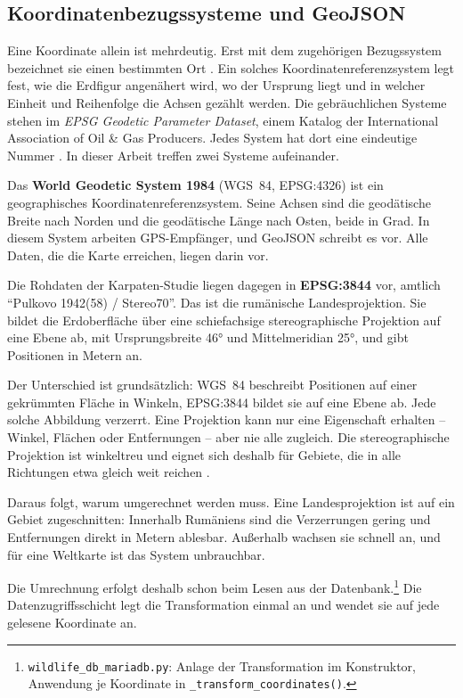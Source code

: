 \documentclass[12pt,a4paper]{report}
\begin{document}
\subsection{Koordinatenbezugssysteme und GeoJSON}
\label{subsec:crs}

Eine Koordinate allein ist mehrdeutig. Erst mit dem zugehörigen Bezugssystem bezeichnet
sie einen bestimmten Ort \cite{GISGrundlagen}. Ein solches Koordinatenreferenzsystem legt
fest, wie die Erdfigur angenähert wird, wo der Ursprung liegt und in welcher Einheit und
Reihenfolge die Achsen gezählt werden. Die gebräuchlichen Systeme stehen im \emph{EPSG
Geodetic Parameter Dataset}, einem Katalog der International Association of Oil \& Gas
Producers. Jedes System hat dort eine eindeutige Nummer \cite{EPSG}. In dieser Arbeit
treffen zwei Systeme aufeinander.

Das \textbf{World Geodetic System 1984} (WGS~84, EPSG:4326) ist ein geographisches
Koordinatenreferenzsystem. Seine Achsen sind die geodätische Breite nach Norden und die
geodätische Länge nach Osten, beide in Grad. In diesem System arbeiten GPS-Empfänger, und
GeoJSON schreibt es vor. Alle Daten, die die Karte erreichen, liegen darin vor.

Die Rohdaten der Karpaten-Studie liegen dagegen in \textbf{EPSG:3844} vor, amtlich
\enquote{Pulkovo 1942(58) / Stereo70}. Das ist die rumänische Landesprojektion. Sie bildet
die Erdoberfläche über eine schiefachsige stereographische Projektion auf eine Ebene ab,
mit Ursprungsbreite 46° und Mittelmeridian 25°, und gibt Positionen in Metern an.

Der Unterschied ist grundsätzlich: WGS~84 beschreibt Positionen auf einer gekrümmten
Fläche in Winkeln, EPSG:3844 bildet sie auf eine Ebene ab. Jede solche Abbildung verzerrt.
Eine Projektion kann nur eine Eigenschaft erhalten -- Winkel, Flächen oder Entfernungen --
aber nie alle zugleich. Die stereographische Projektion ist winkeltreu und eignet sich
deshalb für Gebiete, die in alle Richtungen etwa gleich weit reichen \cite{Snyder1987}.

Daraus folgt, warum umgerechnet werden muss. Eine Landesprojektion ist auf ein Gebiet
zugeschnitten: Innerhalb Rumäniens sind die Verzerrungen gering und Entfernungen direkt in
Metern ablesbar. Außerhalb wachsen sie schnell an, und für eine Weltkarte ist das System
unbrauchbar.

Die Umrechnung erfolgt deshalb schon beim Lesen aus der
Datenbank.\footnote{\texttt{wildlife\_db\_mariadb.py}: Anlage der Transformation im
Konstruktor, Anwendung je Koordinate in \texttt{\_transform\_coordinates()}.} Die
Datenzugriffsschicht legt die Transformation einmal an und wendet sie auf jede gelesene
Koordinate an.
\end{document}
